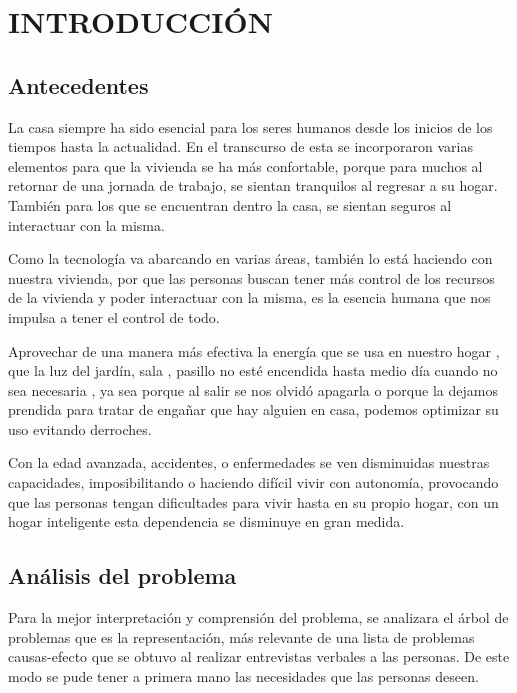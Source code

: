 \documentclass[11pt,letterpaper]{report}
\begin{document}
	

\chapter{INTRODUCCIÓN}

	\section{Antecedentes}
	La casa siempre ha sido esencial para los seres humanos desde los inicios de los tiempos hasta la actualidad. En el transcurso de esta se incorporaron varias elementos para que la vivienda se ha más confortable, porque para muchos al retornar de una jornada de trabajo, se sientan tranquilos al regresar a su hogar. También para los que se encuentran dentro la casa, se sientan seguros al interactuar con la misma.
	
Como la tecnología va abarcando  en varias áreas, también lo está haciendo con nuestra vivienda, por que las personas buscan tener más control de los recursos de la vivienda y poder interactuar con la misma, es la esencia humana que nos impulsa a tener el control de todo.

Aprovechar de una manera más efectiva la energía que se usa en nuestro hogar ,  que la luz del jardín, sala , pasillo  no esté encendida  hasta medio día cuando no sea necesaria  , ya sea porque al salir se nos olvidó apagarla  o porque  la dejamos prendida para tratar de engañar que hay alguien en casa,  podemos optimizar  su  uso evitando derroches.

Con la edad avanzada, accidentes, o  enfermedades  se ven disminuidas nuestras capacidades, imposibilitando o haciendo difícil vivir con autonomía, provocando que las personas tengan dificultades para vivir  hasta en su propio hogar, con  un hogar inteligente  esta dependencia se disminuye en gran medida.

	\section{Análisis del problema}
	Para la mejor interpretación y comprensión del problema, se analizara el árbol de problemas que es la representación, más  relevante  de una lista de problemas causas-efecto que se obtuvo al realizar entrevistas verbales a las personas. De este modo se pude tener a primera mano las necesidades que las personas deseen.
\end{document}
